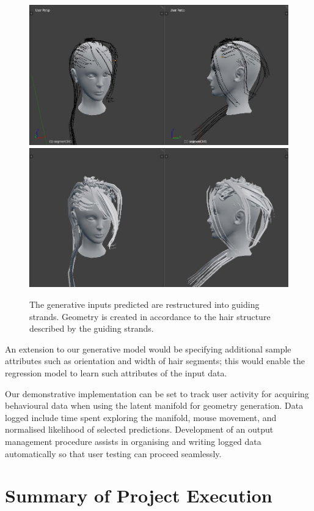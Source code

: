 \documentclass[ %
author={Dillon Keith Diep},
supervisor={Dr. Carl Henrik Ek},
degree={MEng},
title={ART-CG Hair:},
subtitle={Assisted Real-time Content Generation of Stylised Virtual Hair},
type={Research},
year={2017} ]{dissertation}
\begin{document}
	\begin{figure}[!h]
		\centering
		\caption{The generative inputs predicted are restructured into guiding strands. Geometry is created in accordance to the hair structure described by the guiding strands.}
		\includegraphics[scale=0.3]{images/guidingStrands}
		\includegraphics[scale=0.3]{images/guidingExtrusion}
		\label{fig:guidingStrands}
	\end{figure}
	
	An extension to our generative model would be specifying additional sample attributes such as orientation and width of hair segments; this would enable the regression model to learn such attributes of the input data.
	
	Our demonstrative implementation can be set to track user activity for acquiring behavioural data when using the latent manifold for geometry generation. Data logged include time spent exploring the manifold, mouse movement, and normalised likelihood of selected predictions. Development of an output management procedure assists in organising and writing logged data automatically so that user testing can proceed seamlessly.
	
	\section{Summary of Project Execution}
	
\end{document}
